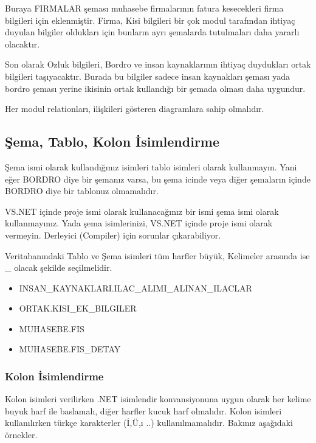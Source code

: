 \documentclass[10pt,a4paper,draft]{article}
\begin{document}
Buraya FIRMALAR şeması muhasebe firmalarının fatura kesecekleri firma bilgileri için eklenmiştir.
Firma, Kisi bilgileri bir çok modul tarafından ihtiyaç duyulan bilgiler oldukları için bunların
ayrı şemalarda tutulmaları daha yararlı olacaktır.

Son olarak Ozluk bilgileri, Bordro ve insan kaynaklarının ihtiyaç duydukları ortak bilgileri taşıyacaktır.
Burada bu bilgiler sadece insan kaynakları şeması yada bordro şeması yerine ikisinin ortak kullandığı
bir şemada olması daha uygundur.

Her modul relationları, ilişkileri gösteren diagramlara sahip olmalıdır.



\subsection{Şema, Tablo, Kolon İsimlendirme}

Şema ismi olarak kullandığınız isimleri tablo isimleri olarak kullanmayın. 
Yani eğer BORDRO diye bir şemanız varsa,	bu şema icinde veya 
diğer şemaların içinde BORDRO diye bir tablonuz olmamalıdır.

VS.NET içinde proje ismi olarak kullanacağınız bir ismi şema ismi  olarak kullanmayınız.
Yada şema isimlerinizi, VS.NET içinde	proje ismi  olarak vermeyin.
Derleyici (Compiler)  için sorunlar çıkarabiliyor.		 


Veritabanındaki Tablo ve Şema isimleri tüm harfler büyük, Kelimeler arasında ise \_ olacak şekilde seçilmelidir.

\begin{itemize}
\item INSAN\_KAYNAKLARI.ILAC\_ALIMI\_ALINAN\_ILACLAR		 
\item ORTAK.KISI\_EK\_BILGILER		 
\item MUHASEBE.FIS		 
\item MUHASEBE.FIS\_DETAY 

\end{itemize}


\subsubsection{Kolon İsimlendirme}
Kolon isimleri verilirken .NET isimlendir konvansiyonuna uygun olarak her kelime buyuk harf ile baslamalı,
diğer harfler kucuk harf olmalıdır.
Kolon isimleri kullanılırken türkçe karakterler (İ,Ü,ı ..) kullanılmamalıdır.
Bakınız aşağıdaki örnekler.
\end{document}
